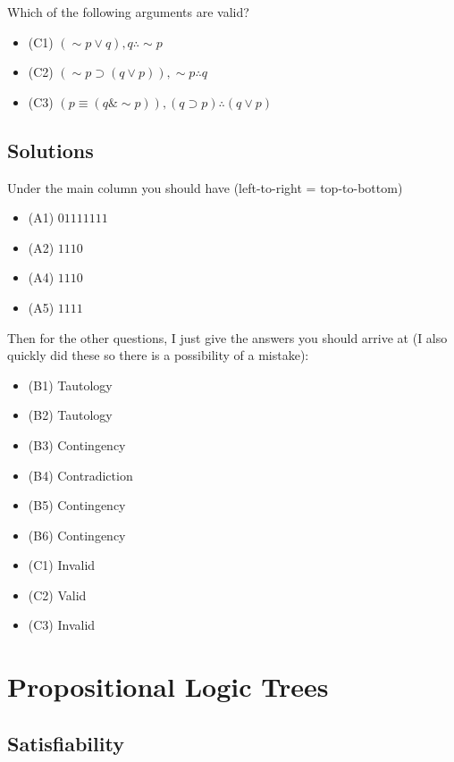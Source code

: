 \documentclass[
]{book}
\providecommand{\tightlist}{%
  \setlength{\itemsep}{0pt}\setlength{\parskip}{0pt}}
\begin{document}
Which of the following arguments are valid?

\begin{itemize}
\tightlist
\item
  (C1) \((\sim p \lor q), q \therefore \sim p\)
\item
  (C2) \((\sim p \supset (q \lor p)), \sim p \therefore q\)
\item
  (C3) \((p \equiv (q \& \sim p)), (q\supset p) \therefore (q \lor p)\)
\end{itemize}

\hypertarget{solutions}{%
\section{Solutions}\label{solutions}}

Under the main column you should have (left-to-right = top-to-bottom)

\begin{itemize}
\tightlist
\item
  (A1) \(01111111\)
\item
  (A2) \(1110\)
\item
  (A4) \(1110\)
\item
  (A5) \(1111\)
\end{itemize}

Then for the other questions, I just give the answers you should arrive at (I also quickly did these so there is a possibility of a mistake):

\begin{itemize}
\tightlist
\item
  (B1) Tautology
\item
  (B2) Tautology
\item
  (B3) Contingency
\item
  (B4) Contradiction
\item
  (B5) Contingency
\item
  (B6) Contingency
\item
  (C1) Invalid
\item
  (C2) Valid
\item
  (C3) Invalid
\end{itemize}

\hypertarget{propositional-logic-trees}{%
\chapter{Propositional Logic Trees}\label{propositional-logic-trees}}

\hypertarget{satisfiability}{%
\section{Satisfiability}\label{satisfiability}}
\end{document}
